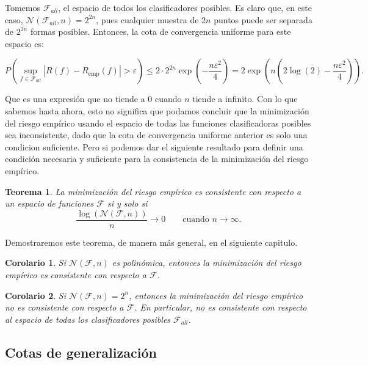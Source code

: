 \documentclass{report}
\newtheorem{thm}{Teorema}[section]
\newtheorem{cor}{Corolario}[thm]
\begin{document}
Tomemos $\mathcal{F}_{all}$, el espacio de todos los clasificadores posibles. Es claro que, en este caso, $\mathcal{N}(\mathcal{F}_{all}, n)=2^{2n}$,
pues cualquier muestra de $2n$ puntos puede ser separada de $2^{2n}$ formas posibles. Entonces, la cota de convergencia uniforme para este espacio
es:

\[
P\left(\sup_{f \in \mathcal{F}_{all}} |R(f) - R_{\text{emp}}(f)| > \varepsilon \right) \leq
2\cdot 2^{2n} \exp\left(-\frac{n\varepsilon^2}{4}\right) = 2\exp\left(n\left( 2\log(2) - \frac{n\varepsilon^2}{4}\right)\right).
\]

Que es una expresión que no tiende a $0$ cuando $n$ tiende a infinito. Con lo que sabemos hasta ahora, esto no significa que podamos 
concluir que la minimización del riesgo empírico
usando el espacio de todas las funciones clasificadoras posibles sea inconsistente, dado que la cota de convergencia uniforme anterior
es solo una condicion suficiente. Pero si podemos dar el siguiente resultado para definir una condición necesaria y suficiente para
la consistencia de la minimización del riesgo empírico.
\begin{thm}\label{thm: consistencia ssi}
    La minimización del riesgo empírico es consistente con respecto a un espacio de funciones $\mathcal{F}$ si y solo si
    \[
    \frac{\log\left(\mathcal{N}(\mathcal{F}, n)\right)}{n} \rightarrow 0 \qquad \text{cuando } n \to \infty.
    \]
    
\end{thm}

Demostraremos este teorema, de manera más general, en el siguiente capitulo.

\begin{cor}
    Si $\mathcal{N}(\mathcal{F}, n)$ es polinómica, entonces la minimización del riesgo empírico es consistente con respecto a $\mathcal{F}$.\\
\end{cor}
\begin{cor}
    Si $\mathcal{N}(\mathcal{F}, n)=2^n$, entonces la minimización del riesgo empírico no es consistente con respecto a $\mathcal{F}$. En 
    particular, no es consistente con respecto al espacio de todas los clasificadores posibles $\mathcal{F}_{all}$.
\end{cor}

\subsection{Cotas de generalización}
\end{document}
